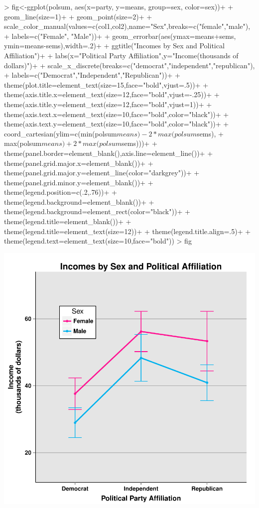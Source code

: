 \documentclass[12pt]{article}
\begin{document}
\begin{Schunk}
\begin{Sinput}
> fig<-ggplot(polsum, aes(x=party, y=means, group=sex, color=sex))+
+ geom_line(size=1)+
+ geom_point(size=2)+
+ scale_color_manual(values=c(col1,col2),name="Sex",breaks=c("female","male"),
+                   labels=c("Female", "Male"))+
+ geom_errorbar(aes(ymax=means+sems, ymin=means-sems),width=.2)+
+ ggtitle("Incomes by Sex and Political Affiliation")+
+ labs(x="Political Party Affiliation",y="Income\n(thousands of dollars)")+
+ scale_x_discrete(breaks=c("democrat","independent","republican"),
+                  labels=c("Democrat","Independent","Republican"))+
+ theme(plot.title=element_text(size=15,face="bold",vjust=.5))+
+ theme(axis.title.x=element_text(size=12,face="bold",vjust=-.25))+
+ theme(axis.title.y=element_text(size=12,face="bold",vjust=1))+
+ theme(axis.text.x=element_text(size=10,face="bold",color="black"))+
+ theme(axis.text.y=element_text(size=10,face="bold",color="black"))+
+ coord_cartesian(ylim=c(min(polsum$means)-2*max(polsum$sems),
+                       max(polsum$means)+2*max(polsum$sems)))+
+ theme(panel.border=element_blank(),axis.line=element_line())+
+ theme(panel.grid.major.x=element_blank())+
+ theme(panel.grid.major.y=element_line(color="darkgrey"))+
+ theme(panel.grid.minor.y=element_blank())+
+ theme(legend.position=c(.2,.76))+
+ theme(legend.background=element_blank())+
+ theme(legend.background=element_rect(color="black"))+
+ theme(legend.title=element_blank())+
+ theme(legend.title=element_text(size=12))+
+ theme(legend.title.align=.5)+
+ theme(legend.text=element_text(size=10,face="bold"))
> fig
\end{Sinput}
\end{Schunk}
\includegraphics{Reproducibility-059}
\end{document}

